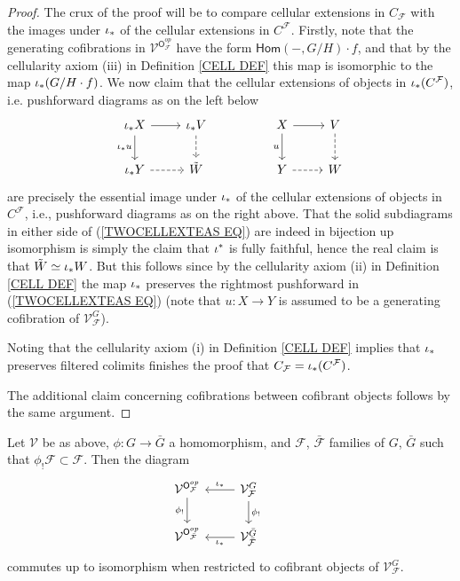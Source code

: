 \documentclass[a4paper,10pt]{article}%
\begin{document}
\begin{proof}
The crux of the proof will be to compare 
cellular extensions in 
$C_{\mathcal{F}}$ with the images under $\iota_{\**}$ of the cellular extensions in 
$C^{\mathcal{F}}$.
Firstly, note that the generating cofibrations in 
$\mathcal{V}^{\mathsf{O}_{\mathcal{F}}^{op}}$
have the form $\mathsf{Hom}(\minus,G/H)\cdot f$, 
and that by the cellularity axiom (iii) in
Definition \ref{CELL DEF}
this map is isomorphic to the map
$\iota_{\**}(G/H \cdot f)$.
We now claim that the cellular extensions of objects in 
$\iota_{\**}(C^{\mathcal{F}})$, i.e. pushforward diagrams as on the left below
\begin{equation}\label{TWOCELLEXTEAS EQ}
\begin{tikzcd}
	\iota_{\**} X \ar{d}[swap]{\iota_{\**}u} \ar{r} &
	\iota_{\**} V \ar[dashed]{d} & &
	X \ar{d}[swap]{u} \ar{r} &
	V \ar[dashed]{d}
\\
	\iota_{\**} Y  \ar[dashed]{r}&
	\tilde{W} & &
	Y \ar[dashed]{r}&
	W
\end{tikzcd}
\end{equation}
are precisely the essential image under $\iota_{\**}$
of the cellular extensions of objects in $C^{\mathcal{F}}$, 
i.e., pushforward diagrams as on the right above. That the solid subdiagrams in either side of (\ref{TWOCELLEXTEAS EQ}) are indeed in bijection up isomorphism is simply the claim that 
$\iota^{\**}$ is fully faithful,
hence the real claim is that $\tilde{W} \simeq \iota_{\**} W$.
But this follows since by 
the cellularity axiom (ii) in
Definition \ref{CELL DEF}
the map $\iota_{\**}$ preserves the rightmost pushforward
in (\ref{TWOCELLEXTEAS EQ}) 
(note that $u \colon X \to Y$ is assumed to be a generating cofibration of $\mathcal{V}^G_{\mathcal{F}}$).

Noting that the cellularity axiom (i) in
Definition \ref{CELL DEF} implies that
$\iota_{\**}$ preserves filtered colimits finishes the proof that $C_{\mathcal{F}} = \iota_{\**}(C^{\mathcal{F}})$.

The additional claim concerning cofibrations between cofibrant objects follows by the same argument.
\end{proof}


\begin{corollary}\label{FINALCOR COR}
Let $\mathcal{V}$ be as above, 
$\phi \colon G \to \bar{G}$
a homomorphism, and 
$\mathcal{F}$, $\bar{\mathcal{F}}$
families of $G$, $\bar{G}$
such that $\phi_{!}\mathcal{F} \subset \mathcal{F}$.
Then the diagram
\[
\begin{tikzcd}
	\mathcal{V}^{\mathsf{O}_{\mathcal{F}}^{op}} \ar{d}[swap]{\phi_!} &
	\mathcal{V}^{G}_{\mathcal{F}} \ar{l}[swap]{\iota_{\**}} \ar{d}{\phi_!}&
\\
	\mathcal{V}^{\mathsf{O}_{\mathcal{\bar{F}}}^{op}}  &
	\mathcal{V}^{\bar{G}}_{\mathcal{\bar{F}}} \ar{l}{\iota_{\**}}&
\end{tikzcd}
\]
commutes up to isomorphism when restricted to 
cofibrant objects of $\mathcal{V}^{G}_{\mathcal{F}}$.
\end{corollary}
\end{document}
